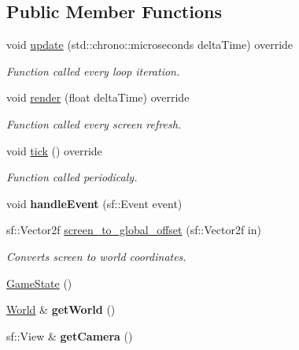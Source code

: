 \subsection*{Public Member Functions}
\begin{DoxyCompactItemize}
\item 
void \hyperlink{classGameState_aba059d7ab1a53b8f5d795292ed37abac}{update} (std\-::chrono\-::microseconds delta\-Time) override
\begin{DoxyCompactList}\small\item\em Function called every loop iteration. \end{DoxyCompactList}\item 
void \hyperlink{classGameState_aa4061260f4ca0acc7d1833dbb6691f0f}{render} (float delta\-Time) override
\begin{DoxyCompactList}\small\item\em Function called every screen refresh. \end{DoxyCompactList}\item 
void \hyperlink{classGameState_ae9ff24d75f36ef56daa6a180d4b38a09}{tick} () override
\begin{DoxyCompactList}\small\item\em Function called periodicaly. \end{DoxyCompactList}\item 
\hypertarget{classGameState_a087e01d3abb44eaa7064aa94d8ee5933}{void {\bfseries handle\-Event} (sf\-::\-Event event)}\label{classGameState_a087e01d3abb44eaa7064aa94d8ee5933}

\item 
\hypertarget{classGameState_a945e9dfe15e3708799977ed8133f7678}{sf\-::\-Vector2f \hyperlink{classGameState_a945e9dfe15e3708799977ed8133f7678}{screen\-\_\-to\-\_\-global\-\_\-offset} (sf\-::\-Vector2f in)}\label{classGameState_a945e9dfe15e3708799977ed8133f7678}

\begin{DoxyCompactList}\small\item\em Converts screen to world coordinates. \end{DoxyCompactList}\item 
\hyperlink{classGameState_a4fa0a2bf50315c4a35a3890a0adcee5c}{Game\-State} ()
\item 
\hypertarget{classGameState_aebc076f9bcec0aa4317eff9e9a8d566e}{\hyperlink{classWorld}{World} \& {\bfseries get\-World} ()}\label{classGameState_aebc076f9bcec0aa4317eff9e9a8d566e}

\item 
\hypertarget{classGameState_a45607b8a0473073090740500826268c0}{sf\-::\-View \& {\bfseries get\-Camera} ()}\label{classGameState_a45607b8a0473073090740500826268c0}


\end{DoxyCompactItemize}

